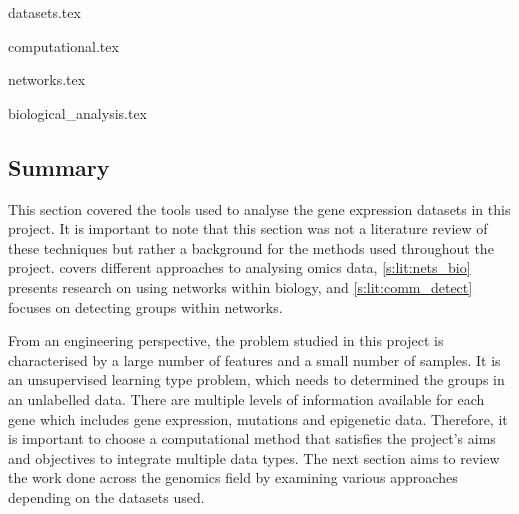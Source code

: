 {datasets.tex}

{computational.tex}

{networks.tex}

{biological_analysis.tex}



\subsection{Summary} \label{s:lit:choosing_ml}


This section covered the tools used to analyse the gene expression datasets in this project. It is important to note that this section was not a literature review of these techniques but rather a background for the methods used throughout the project.  covers different approaches to analysing omics data, \cref{s:lit:nets_bio} presents research on using networks within biology, and \cref{s:lit:comm_detect} focuses on detecting groups within networks.

From an engineering perspective, the problem studied in this project is characterised by a large number of features and a small number of samples. It is an unsupervised learning type problem, which needs to determined the groups in an unlabelled data. There are multiple levels of information available for each gene which includes gene expression, mutations and epigenetic data. Therefore, it is important to choose a computational method that satisfies the project's aims and objectives to integrate multiple data types. The next section aims to review the work done across the genomics field by examining various approaches depending on the datasets used.
